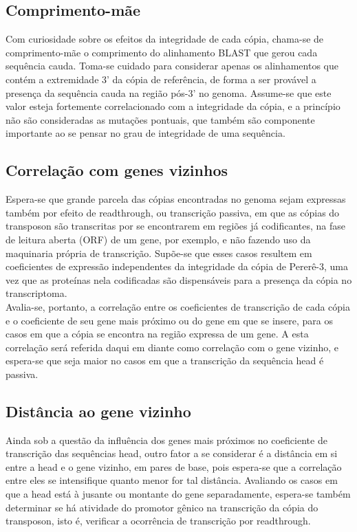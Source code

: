 \documentclass{article}
\begin{document}
\subsection{Comprimento-mãe}
Com curiosidade sobre os efeitos da integridade de cada cópia, chama-se de comprimento-mãe o comprimento do alinhamento BLAST que gerou cada sequência cauda. Toma-se cuidado para considerar apenas os alinhamentos que contém a extremidade 3' da cópia de referência, de forma a ser provável a presença da sequência cauda na região pós-3' no genoma. Assume-se que este valor esteja fortemente correlacionado com a integridade da cópia, e a princípio não são consideradas as mutações pontuais, que também são componente importante ao se pensar no grau de integridade de uma sequência.

\subsection{Correlação com genes vizinhos}
Espera-se que grande parcela das cópias encontradas no genoma sejam expressas também por efeito de readthrough, ou transcrição passiva, em que as cópias do transposon são transcritas por se encontrarem em regiões já codificantes, na fase de leitura aberta (ORF) de um gene, por exemplo, e não fazendo uso da maquinaria própria de transcrição. Supõe-se que esses casos resultem em coeficientes de expressão independentes da integridade da cópia de Pererê-3, uma vez que as proteínas nela codificadas são dispensáveis para a presença da cópia no transcriptoma.\\

Avalia-se, portanto, a correlação entre os coeficientes de transcrição de cada cópia e o coeficiente de seu gene mais próximo ou do gene em que se insere, para os casos em que a cópia se encontra na região expressa de um gene. A esta correlação será referida daqui em diante como correlação com o gene vizinho, e espera-se que seja maior no casos em que a transcrição da sequência head é passiva.

\subsection{Distância ao gene vizinho}
Ainda sob a questão da influência dos genes mais próximos no coeficiente de transcrição das sequências head, outro fator a se considerar é a distância em si entre a head e o gene vizinho, em pares de base, pois espera-se que a correlação entre eles se intensifique quanto menor for tal distância. Avaliando os casos em que a head está à jusante ou montante do gene separadamente, espera-se também determinar se há atividade do promotor gênico na transcrição da cópia do transposon, isto é, verificar a ocorrência de transcrição por readthrough.
\end{document}
